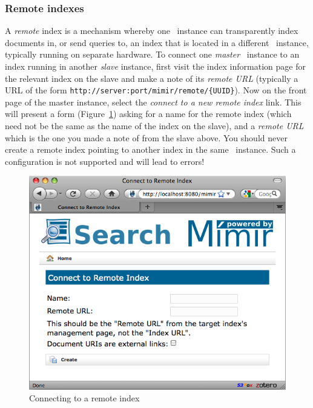 \subsubsection{Remote indexes}\label{sec:admin:remote-index}
A {\em remote} index is a mechanism whereby one \Mimir\ instance can
transparently index documents in, or send queries to, an index that is located
in a different \Mimir\ instance, typically running on separate hardware.  To
connect one {\em master} \Mimir\ instance to an index running in another {\em
slave} instance, first visit the index information page for the relevant
index on the slave and make a note of its {\em remote URL} (typically a URL of
the form \verb|http://server:port/mimir/remote/{UUID}|).  Now on the front page
of the master instance, select the {\em connect to a new remote index} link.
This will present a form (Figure~\ref{fig:connect-remote-index}) asking for a
name for the remote index (which need not be the same as the name of the index
on the slave), and a {\em remote URL} which is the one you made a note of from
the slave above. You should never create a remote index pointing to another
index in the same \Mimir\ instance. Such a configuration is not supported and
will lead to errors!
\begin{figure}[htb!]
\begin{center}
\includegraphics[scale=0.5]{img/connect-remote-index}
\end{center}
\caption{Connecting to a remote index}
\label{fig:connect-remote-index}
\end{figure}
%

